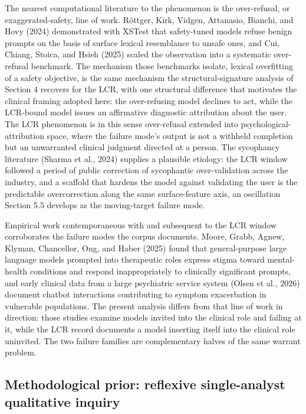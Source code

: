 \documentclass[11pt]{article}
\begin{document}
The nearest computational literature to the phenomenon is the over-refusal, or exaggerated-safety, line of work. R{\"o}ttger, Kirk, Vidgen, Attanasio, Bianchi, and Hovy (2024) demonstrated with XSTest that safety-tuned models refuse benign prompts on the basis of surface lexical resemblance to unsafe ones, and Cui, Chiang, Stoica, and Hsieh (2025) scaled the observation into a systematic over-refusal benchmark. The mechanism those benchmarks isolate, lexical overfitting of a safety objective, is the same mechanism the structural-signature analysis of Section 4 recovers for the LCR, with one structural difference that motivates the clinical framing adopted here: the over-refusing model declines to act, while the LCR-bound model issues an affirmative diagnostic attribution about the user. The LCR phenomenon is in this sense over-refusal extended into psychological-attribution space, where the failure mode's output is not a withheld completion but an unwarranted clinical judgment directed at a person. The sycophancy literature (Sharma et al., 2024) supplies a plausible etiology: the LCR window followed a period of public correction of sycophantic over-validation across the industry, and a scaffold that hardens the model against validating the user is the predictable overcorrection along the same surface-feature axis, an oscillation Section 5.5 develops as the moving-target failure mode.

Empirical work contemporaneous with and subsequent to the LCR window corroborates the failure modes the corpus documents. Moore, Grabb, Agnew, Klyman, Chancellor, Ong, and Haber (2025) found that general-purpose large language models prompted into therapeutic roles express stigma toward mental-health conditions and respond inappropriately to clinically significant prompts, and early clinical data from a large psychiatric service system (Olsen et al., 2026) document chatbot interactions contributing to symptom exacerbation in vulnerable populations. The present analysis differs from that line of work in direction: those studies examine models invited into the clinical role and failing at it, while the LCR record documents a model inserting itself into the clinical role uninvited. The two failure families are complementary halves of the same warrant problem.

\subsection{Methodological prior: reflexive single-analyst qualitative inquiry}
\end{document}
